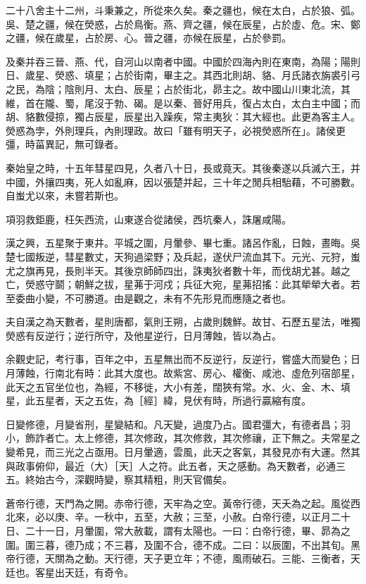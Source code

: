 \documentclass[10pt,fontset=adobe,UTF8,twoside]{ctexrep}
\begin{document}
二十八舍主十二州，斗秉兼之，所從來久矣。秦之疆也，候在太白，占於狼、弧。吳、楚之疆，候在熒惑，占於鳥衡。燕、齊之疆，候在辰星，占於虛、危。宋、鄭之疆，候在歲星，占於房、心。晉之疆，亦候在辰星，占於參罰。

及秦并吞三晉、燕、代，自河山以南者中國。中國於四海內則在東南，為陽；陽則日、歲星、熒惑、填星；占於街南，畢主之。其西北則胡、貉、月氏諸衣旃裘引弓之民，為陰；陰則月、太白、辰星；占於街北，昴主之。故中國山川東北流，其維，首在隴、蜀，尾沒于勃、碣。是以秦、晉好用兵，復占太白，太白主中國；而胡、貉數侵掠，獨占辰星，辰星出入躁疾，常主夷狄：其大經也。此更為客主人。熒惑為孛，外則理兵，內則理政。故曰「雖有明天子，必視熒惑所在」。諸侯更彊，時菑異記，無可錄者。

秦始皇之時，十五年彗星四見，久者八十日，長或竟天。其後秦遂以兵滅六王，并中國，外攘四夷，死人如亂麻，因以張楚并起，三十年之閒兵相駘藉，不可勝數。自蚩尤以來，未嘗若斯也。

項羽救鉅鹿，枉矢西流，山東遂合從諸侯，西坑秦人，誅屠咸陽。

漢之興，五星聚于東井。平城之圍，月暈參、畢七重。諸呂作亂，日蝕，晝晦。吳楚七國叛逆，彗星數丈，天狗過梁野；及兵起，遂伏尸流血其下。元光、元狩，蚩尤之旗再見，長則半天。其後京師師四出，誅夷狄者數十年，而伐胡尤甚。越之亡，熒惑守鬬；朝鮮之拔，星茀于河戍；兵征大宛，星茀招搖：此其犖犖大者。若至委曲小變，不可勝道。由是觀之，未有不先形見而應隨之者也。

夫自漢之為天數者，星則唐都，氣則王朔，占歲則魏鮮。故甘、石歷五星法，唯獨熒惑有反逆行；逆行所守，及他星逆行，日月薄蝕，皆以為占。

余觀史記，考行事，百年之中，五星無出而不反逆行，反逆行，嘗盛大而變色；日月薄蝕，行南北有時：此其大度也。故紫宮、房心、權衡、咸池、虛危列宿部星，此天之五官坐位也，為經，不移徙，大小有差，闊狹有常。水、火、金、木、填星，此五星者，天之五佐，為［經］緯，見伏有時，所過行贏縮有度。

日變修德，月變省刑，星變結和。凡天變，過度乃占。國君彊大，有德者昌；羽小，飾詐者亡。太上修德，其次修政，其次修救，其次修禳，正下無之。夫常星之變希見，而三光之占亟用。日月暈適，雲風，此天之客氣，其發見亦有大運。然其與政事俯仰，最近（大）［天］人之符。此五者，天之感動。為天數者，必通三五。終始古今，深觀時變，察其精粗，則天官備矣。

蒼帝行德，天門為之開。赤帝行德，天牢為之空。黃帝行德，天夭為之起。風從西北來，必以庚、辛。一秋中，五至，大赦；三至，小赦。白帝行德，以正月二十日、二十一日，月暈圍，常大赦載，謂有太陽也。一曰：白帝行德，畢、昴為之圍。圍三暮，德乃成；不三暮，及圍不合，德不成。二曰：以辰圍，不出其旬。黑帝行德，天關為之動。天行德，天子更立年；不德，風雨破石。三能、三衡者，天廷也。客星出天廷，有奇令。
\end{document}
